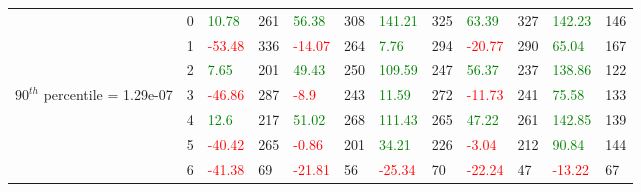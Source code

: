 \begin{table}[htb!]
\begin{adjustwidth}{-0.9in}{-0.9in}
\begin{tabular}{|p{5em}|p{2em}|p{3em}|p{3em}|p{3em}|p{3em}|p{3em}|p{3em}|p{3em}|p{3em}|p{3em}|p{3em}|}
            & 0 & \textcolor{green}{10.78} & 261 & \textcolor{green}{56.38} & 308 & \textcolor{green}{141.21} & 325 & \textcolor{green}{63.39} & 327 & \textcolor{green}{142.23} & 146\\\cline{3-12}
            & 1 & \textcolor{red}{-53.48} & 336 & \textcolor{red}{-14.07} & 264 & \textcolor{green}{7.76} & 294 & \textcolor{red}{-20.77} & 290 & \textcolor{green}{65.04} & 167\\\cline{3-12}
            & 2 & \textcolor{green}{7.65} & 201 & \textcolor{green}{49.43} & 250 & \textcolor{green}{109.59} & 247 & \textcolor{green}{56.37} & 237 & \textcolor{green}{138.86} & 122\\\cline{3-12}
            $90^{th}$ percentile = 1.29e-07 & 3 & \textcolor{red}{-46.86} & 287 & \textcolor{red}{-8.9} & 243 & \textcolor{green}{11.59} & 272 & \textcolor{red}{-11.73} & 241 & \textcolor{green}{75.58} & 133\\[-5.5ex]\cline{3-12}
            & 4 & \textcolor{green}{12.6} & 217 & \textcolor{green}{51.02} & 268 & \textcolor{green}{111.43} & 265 & \textcolor{green}{47.22} & 261 & \textcolor{green}{142.85} & 139\\\cline{3-12}
            & 5 & \textcolor{red}{-40.42} & 265 & \textcolor{red}{-0.86} & 201 & \textcolor{green}{34.21} & 226 & \textcolor{red}{-3.04} & 212 & \textcolor{green}{90.84} & 144\\\cline{3-12}
            & 6 & \textcolor{red}{-41.38} & 69 & \textcolor{red}{-21.81} & 56 & \textcolor{red}{-25.34} & 70 & \textcolor{red}{-22.24} & 47 & \textcolor{red}{-13.22} & 67\\\hline\hline


\end{tabular}
\end{adjustwidth}
\end{table}
